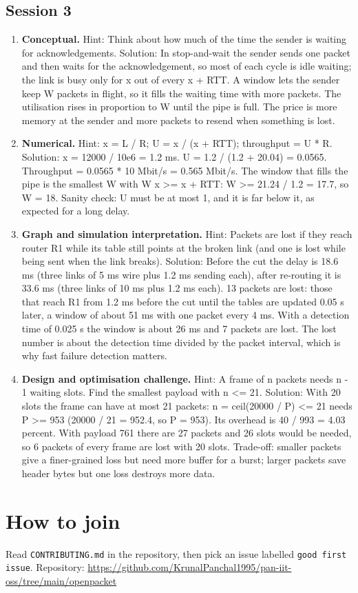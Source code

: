 \documentclass[11pt,a4paper]{article}
\begin{document}
\subsection*{Session 3}
\begin{enumerate}[nosep]
\item \textbf{Conceptual.} Hint: Think about how much of the time the sender is waiting for acknowledgements. Solution: In stop-and-wait the sender sends one packet and then waits for the acknowledgement, so most of each cycle is idle waiting; the link is busy only for x out of every x + RTT. A window lets the sender keep W packets in flight, so it fills the waiting time with more packets. The utilisation rises in proportion to W until the pipe is full. The price is more memory at the sender and more packets to resend when something is lost.
\item \textbf{Numerical.} Hint: x = L / R; U = x / (x + RTT); throughput = U * R. Solution: x = 12000 / 10e6 = 1.2 ms. U = 1.2 / (1.2 + 20.04) = 0.0565. Throughput = 0.0565 * 10 Mbit/s = 0.565 Mbit/s. The window that fills the pipe is the smallest W with W x \textgreater{}= x + RTT: W \textgreater{}= 21.24 / 1.2 = 17.7, so W = 18. Sanity check: U must be at most 1, and it is far below it, as expected for a long delay.
\item \textbf{Graph and simulation interpretation.} Hint: Packets are lost if they reach router R1 while its table still points at the broken link (and one is lost while being sent when the link breaks). Solution: Before the cut the delay is 18.6 ms (three links of 5 ms wire plus 1.2 ms sending each), after re-routing it is 33.6 ms (three links of 10 ms plus 1.2 ms each). 13 packets are lost: those that reach R1 from 1.2 ms before the cut until the tables are updated 0.05 s later, a window of about 51 ms with one packet every 4 ms. With a detection time of 0.025 s the window is about 26 ms and 7 packets are lost. The lost number is about the detection time divided by the packet interval, which is why fast failure detection matters.
\item \textbf{Design and optimisation challenge.} Hint: A frame of n packets needs n - 1 waiting slots. Find the smallest payload with n \textless{}= 21. Solution: With 20 slots the frame can have at most 21 packets: n = ceil(20000 / P) \textless{}= 21 needs P \textgreater{}= 953 (20000 / 21 = 952.4, so P = 953). Its overhead is 40 / 993 = 4.03 percent. With payload 761 there are 27 packets and 26 slots would be needed, so 6 packets of every frame are lost with 20 slots. Trade-off: smaller packets give a finer-grained loss but need more buffer for a burst; larger packets save header bytes but one loss destroys more data.
\end{enumerate}

\section{How to join}
Read \texttt{CONTRIBUTING.md} in the repository, then pick an issue labelled \texttt{good first issue}. Repository: \url{https://github.com/KrunalPanchal1995/pan-iit-oss/tree/main/openpacket}
\end{document}
